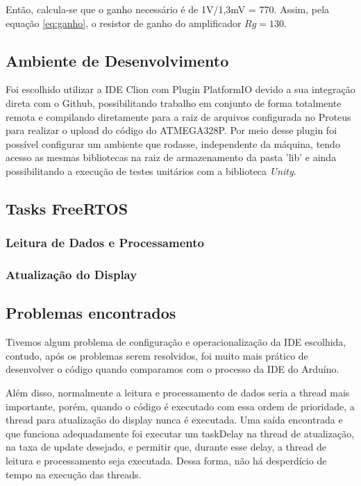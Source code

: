 \documentclass[a4paper, 12pt]{article}
\begin{document}
	




	Então, calcula-se que o ganho necessário é de 1V/1,3mV = 770. Assim, pela equação \ref{eq:ganho}, o resistor de ganho do amplificador $ Rg = 130 $. 
	
	
	



	
	\subsection{Ambiente de Desenvolvimento}
	
	Foi escolhido utilizar a IDE Clion com Plugin PlatformIO devido a sua integração direta com o Github, possibilitando trabalho em conjunto de forma totalmente remota e compilando diretamente para a raiz de arquivos configurada no Proteus para realizar o upload do código do ATMEGA328P. Por meio desse plugin foi possível configurar um ambiente que rodasse, independente da máquina, tendo acesso as mesmas bibliotecas na raiz de armazenamento da pasta 'lib' e ainda possibilitando a execução de testes unitários com a biblioteca \textit{Unity}. 
	
	\subsection{Tasks FreeRTOS}
	
	\subsubsection{Leitura de Dados e Processamento}
	
	\subsubsection{Atualização do Display}
	
	\subsection{Problemas encontrados}
	\label{poblemas}
	Tivemos algum problema de configuração e operacionalização da IDE escolhida, contudo, após os problemas serem resolvidos, foi muito mais prático de desenvolver o código quando comparamos com o processo da IDE do Arduíno. 

	Além disso, normalmente a leitura e processamento de dados seria a thread mais importante, porém, quando o código é executado com essa ordem de prioridade, a thread para atualização do display nunca é executada. Uma saída encontrada e que funciona adequadamente foi executar um taskDelay na thread de atualização, na taxa de update desejado, e permitir que, durante esse delay, a thread de leitura e processamento seja executada. Dessa forma, não há desperdício de tempo na execução das threads.  
	
\end{document}

